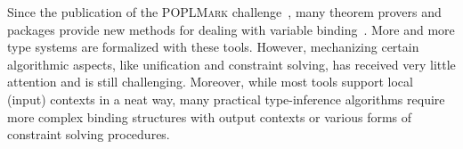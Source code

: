 
Since the publication of the \textsc{POPLMark} challenge~\citep{aydemir2005mechanized},
many theorem provers and packages provide new methods for dealing
with variable binding~\citep{aydemir2008engineering,urban2008nominalTech,chlipala2008parametric}.
More and more type systems are formalized with these tools.
However, mechanizing certain algorithmic aspects, like unification and
constraint solving, has received very little attention and is still challenging.
Moreover, while most tools support local (input) contexts in a neat way,
many practical type-inference algorithms require
more complex binding structures with output contexts or various forms of constraint solving procedures.

